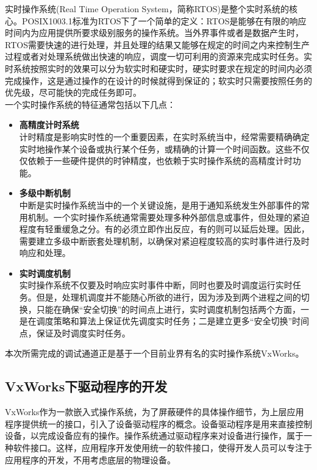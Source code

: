 {实时操作系统(Real Time Operation System，简称RTOS)是整个实时系统的核心。POSIX1003.1标准为RTOS下了一个简单的定义：RTOS是能够在有限的响应时间内为应用提供所要求级别服务的操作系统\cite{Renard20081003}。当外界事件或者是数据产生时，RTOS需要快速的进行处理，并且处理的结果又能够在规定的时间之内来控制生产过程或者对处理系统做出快速的响应，调度一切可利用的资源来完成实时任务。实时系统按照实时的效果可以分为软实时和硬实时，硬实时要求在规定的时间内必须完成操作，这是通过操作的在设计的时候就得到保证的；软实时只需要按照任务的优先级，尽可能快的完成任务即可。\\
一个实时操作系统的特征通常包括以下几点：
\begin{itemize}
\item \textbf{高精度计时系统}\\
	计时精度是影响实时性的一个重要因素，在实时系统当中，经常需要精确确定实时地操作某个设备或执行某个任务，或精确的计算一个时间函数。这些不仅仅依赖于一些硬件提供的时钟精度，也依赖于实时操作系统的高精度计时功能。
\item \textbf{多级中断机制}\\
	中断是实时操作系统当中的一个关键设施，是用于通知系统发生外部事件的常用机制。一个实时操作系统通常需要处理多种外部信息或事件，但处理的紧迫程度有轻重缓急之分。有的必须立即作出反应，有的则可以延后处理。因此，需要建立多级中断嵌套处理机制，以确保对紧迫程度较高的实时事件进行及时响应和处理。
\item \textbf{实时调度机制}\\
	实时操作系统不仅要及时响应实时事件中断，同时也要及时调度运行实时任务。但是，处理机调度并不能随心所欲的进行，因为涉及到两个进程之间的切换，只能在确保“安全切换”的时间点上进行，实时调度机制包括两个方面，一是在调度策略和算法上保证优先调度实时任务；二是建立更多“安全切换”时间点，保证及时调度实时任务。
\end{itemize}
本次所需完成的调试通道正是基于一个目前业界有名的实时操作系统VxWorks。






\subsection{VxWorks下驱动程序的开发}
	
	VxWorks作为一款嵌入式操作系统，为了屏蔽硬件的具体操作细节，为上层应用程序提供统一的接口，引入了设备驱动程序的概念。设备驱动程序是用来直接控制设备，以完成设备应有的操作。操作系统通过驱动程序来对设备进行操作，属于一种软件接口。这样，应用程序开发使用统一的软件接口，使得开发人员可以专注于应用程序的开发，不用考虑底层的物理设备。
	
}
